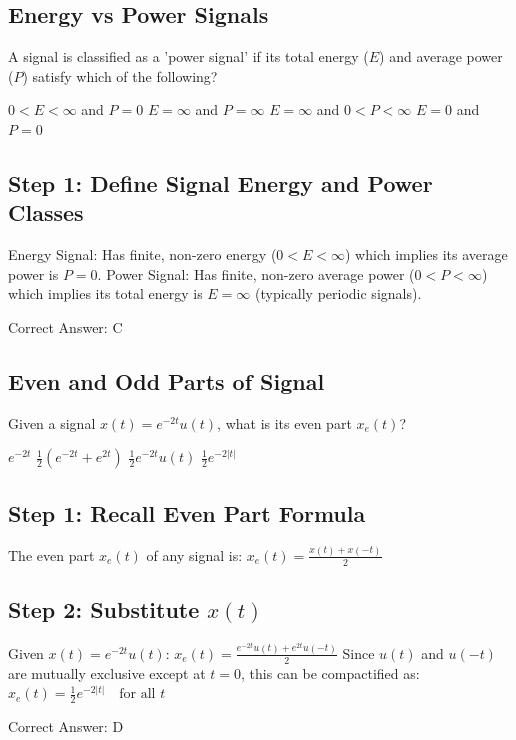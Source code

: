 \subsection{Energy vs Power Signals}

A signal is classified as a 'power signal' if its total energy ($E$) and average power ($P$) satisfy which of the following?

\begin{choices}
    \choice $0 < E < \infty$ and $P = 0$
    \choice $E = \infty$ and $P = \infty$
    \correctchoice $E = \infty$ and $0 < P < \infty$
    \choice $E = 0$ and $P = 0$
\end{choices}

\begin{solution}

\subsection*{Step 1: Define Signal Energy and Power Classes}
Energy Signal: Has finite, non-zero energy ($0 < E < \infty$) which implies its average power is $P = 0$.
Power Signal: Has finite, non-zero average power ($0 < P < \infty$) which implies its total energy is $E = \infty$ (typically periodic signals).

Correct Answer: C
\end{solution}

\clearpage

\subsection{Even and Odd Parts of Signal}

Given a signal $x(t) = e^{-2t} u(t)$, what is its even part $x_e(t)$?

\begin{choices}
    \choice $e^{-2t}$
    \choice $\frac{1}{2} (e^{-2t} + e^{2t})$
    \choice $\frac{1}{2} e^{-2t} u(t)$
    \correctchoice $\frac{1}{2} e^{-2|t|}$
\end{choices}

\begin{solution}

\subsection*{Step 1: Recall Even Part Formula}
The even part $x_e(t)$ of any signal is:
$x_e(t) = \frac{x(t) + x(-t)}{2}$

\subsection*{Step 2: Substitute $x(t)$}
Given $x(t) = e^{-2t} u(t)$:
$x_e(t) = \frac{e^{-2t} u(t) + e^{2t} u(-t)}{2}$
Since $u(t)$ and $u(-t)$ are mutually exclusive except at $t=0$, this can be compactified as:
$x_e(t) = \frac{1}{2} e^{-2|t|}\quad \text{for all } t$

Correct Answer: D
\end{solution}

